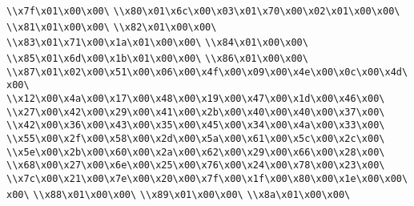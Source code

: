 \verb|\\x7f\x01\x00\x00\|\newline
\verb|\\x80\x01\x6c\x00\x03\x01\x70\x00\x02\x01\x00\x00\|\newline
\verb|\\x81\x01\x00\x00\|\newline
\verb|\\x82\x01\x00\x00\|\newline
\verb|\\x83\x01\x71\x00\x1a\x01\x00\x00\|\newline
\verb|\\x84\x01\x00\x00\|\newline
\verb|\\x85\x01\x6d\x00\x1b\x01\x00\x00\|\newline
\verb|\\x86\x01\x00\x00\|\newline
\verb|\\x87\x01\x02\x00\x51\x00\x06\x00\x4f\x00\x09\x00\x4e\x00\x0c\x00\x4d\x00\|\newline
\verb|\\x12\x00\x4a\x00\x17\x00\x48\x00\x19\x00\x47\x00\x1d\x00\x46\x00\|\newline
\verb|\\x27\x00\x42\x00\x29\x00\x41\x00\x2b\x00\x40\x00\x40\x00\x37\x00\|\newline
\verb|\\x42\x00\x36\x00\x43\x00\x35\x00\x45\x00\x34\x00\x4a\x00\x33\x00\|\newline
\verb|\\x55\x00\x2f\x00\x58\x00\x2d\x00\x5a\x00\x61\x00\x5c\x00\x2c\x00\|\newline
\verb|\\x5e\x00\x2b\x00\x60\x00\x2a\x00\x62\x00\x29\x00\x66\x00\x28\x00\|\newline
\verb|\\x68\x00\x27\x00\x6e\x00\x25\x00\x76\x00\x24\x00\x78\x00\x23\x00\|\newline
\verb|\\x7c\x00\x21\x00\x7e\x00\x20\x00\x7f\x00\x1f\x00\x80\x00\x1e\x00\x00\x00\|\newline
\verb|\\x88\x01\x00\x00\|\newline
\verb|\\x89\x01\x00\x00\|\newline
\verb|\\x8a\x01\x00\x00\|\newline
